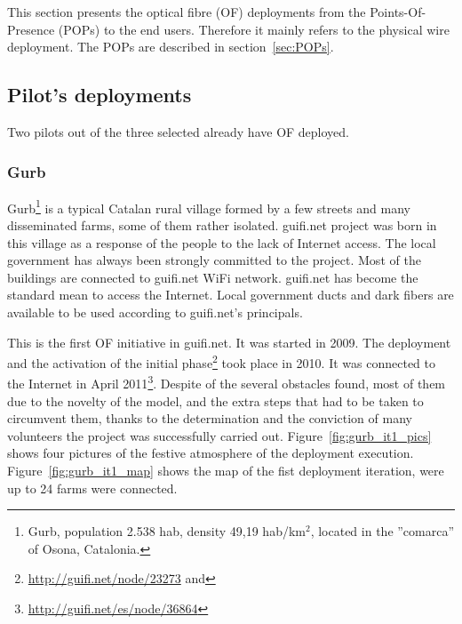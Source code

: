 This section presents the optical fibre (OF) deployments from the Points-Of-Presence (POPs) to the end users. Therefore it mainly refers to the physical wire deployment. The POPs are described in section~\ref{sec:POPs}.


\subsection{Pilot's deployments}

Two pilots out of the three selected already have OF deployed.

\subsubsection{Gurb}

Gurb\footnote{Gurb, population 2.538 hab, density 49,19 hab/km$^{2}$, located in the ''comarca'' of Osona, Catalonia.} is a typical Catalan rural village formed by a few streets and many disseminated farms, some of them rather isolated. guifi.net project was born in this village as a response of the people to the lack of Internet access. The local government has always been strongly committed to the project. Most of the buildings are connected to guifi.net WiFi network. guifi.net has become the standard mean to access the Internet. Local government ducts and dark fibers are available to be used according to guifi.net's principals.

This is the first OF initiative in guifi.net. It was started in 2009. The deployment and the activation of the initial phase\footnote{\url{http://guifi.net/node/23273} and } took place in 2010. It was connected to the Internet in April 2011\footnote{\url{http://guifi.net/es/node/36864}}. Despite of the several obstacles found, most of them due to the novelty of the model, and the extra steps that had to be taken to circumvent them, thanks to the determination and the conviction of many volunteers the project was successfully carried out. Figure~\ref{fig:gurb_it1_pics} shows four pictures of the festive atmosphere of the deployment execution. Figure~\ref{fig:gurb_it1_map} shows the map of the fist deployment iteration, were up to 24 farms were connected. 

